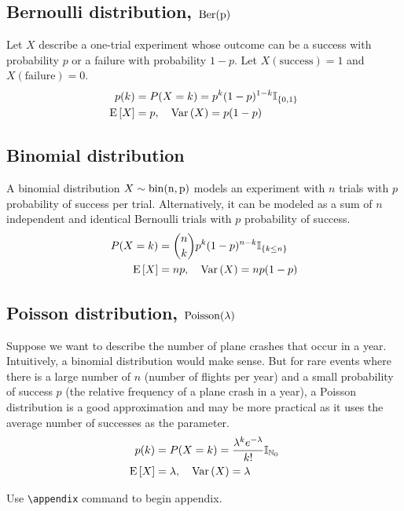 \documentclass[12pt, notitlepage]{article}
\begin{document}
\subsection*{Bernoulli distribution, $\rm{Ber}(p)$}
Let $X$ describe a one-trial experiment whose outcome can be a success with probability $p$ or a failure with probability $1-p$. Let $X(\text{success}) = 1$ and $X(\text{failure}) = 0$. 
\begin{align*}
p(k) & = P(X=k) = p^k (1-p)^{1-k} \mathbb{I}_{\{0,1\}} \\
\mathrm{E}\,[X] & = p, \quad \mathrm{Var}\,(X) = p(1-p)
\end{align*}

\subsection*{Binomial distribution}
A binomial distribution $X \sim \rm{bin}(n, p)$ models an experiment with $n$ trials with $p$ probability of success per trial. Alternatively, it can be modeled as a sum of $n$ independent and identical Bernoulli trials with $p$ probability of success. 
\begin{align*}
P(X=k) & = \binom{n}{k}p^k (1-p)^{n-k}\mathbb{I}_{\{k \leq n\}}\\
\mathrm{E}\,[X] & = np, \quad \mathrm{Var}\,(X)  = np(1-p)
\end{align*}


\subsection*{Poisson distribution, $\rm{Poisson}(\lambda)$}
Suppose we want to describe the number of plane crashes that occur in a year. Intuitively, a binomial distribution would make sense. But for rare events where there is a large number of $n$ (number of flights per year) and a small probability of success $p$ (the relative frequency of a plane crash in a year), a Poisson distribution is a good approximation and may be more practical as it uses the average number of successes as the parameter. 
\begin{align*}
p(k) &= P(X =k) = \dfrac{\lambda^k e^{-\lambda}}{k!}\mathbb{I}_{\mathbb{N}_0} \\
\mathrm{E}\,[X] &= \lambda, \quad \mathrm{Var}\,(X) = \lambda
\end{align*}



\newpage 
\appendix 

\begin{notes}
Use \verb|\appendix| command to begin appendix. 
\end{notes}
\end{document}
